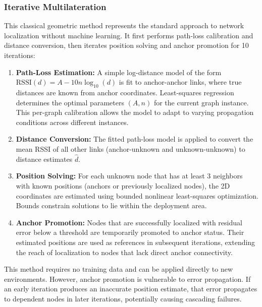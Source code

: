 \documentclass{ieeeaccess}
\begin{document}
\subsubsection{Iterative Multilateration}
This classical geometric method represents the standard approach to network localization without machine learning. It first performs path-loss calibration and distance conversion, then iterates position solving and anchor promotion for 10 iterations:
\begin{enumerate}
    \item \textbf{Path-Loss Estimation:} A simple log-distance model of the form $\mathrm{RSSI}(d) = A - 10n\log_{10}(d)$ is fit to anchor-anchor links, where true distances are known from anchor coordinates. Least-squares regression determines the optimal parameters $(A, n)$ for the current graph instance. This per-graph calibration allows the model to adapt to varying propagation conditions across different instances.
    \item \textbf{Distance Conversion:} The fitted path-loss model is applied to convert the mean RSSI of all other links (anchor-unknown and unknown-unknown) to distance estimates $\hat{d}$.
    \item \textbf{Position Solving:} For each unknown node that has at least 3 neighbors with known positions (anchors or previously localized nodes), the 2D coordinates are estimated using bounded nonlinear least-squares optimization. Bounds constrain solutions to lie within the deployment area.
    \item \textbf{Anchor Promotion:} Nodes that are successfully localized with residual error below a threshold are temporarily promoted to anchor status. Their estimated positions are used as references in subsequent iterations, extending the reach of localization to nodes that lack direct anchor connectivity.
\end{enumerate}
This method requires no training data and can be applied directly to new environments. However, anchor promotion is vulnerable to error propagation. If an early iteration produces an inaccurate position estimate, that error propagates to dependent nodes in later iterations, potentially causing cascading failures.
\end{document}
